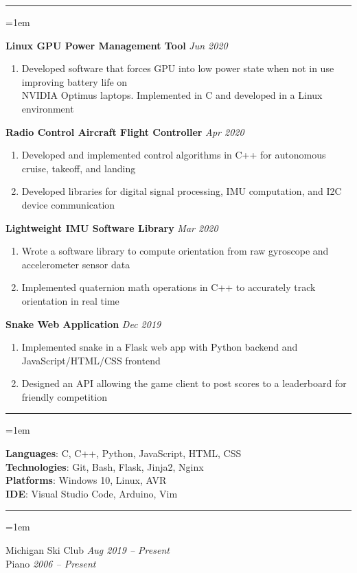 \documentclass[12pt]{article}
\newcommand{\rheader}[1] { 
    \noindent{ 
        \large 
        \textbf{#1} 
        \par 
    }
    \vspace{-10pt}
    \noindent 
    \rule{7.5in}{0.5pt} 
}
\newcommand{\rdate}[1] {
    \hfill 
    \textit{#1}
}
\newcommand{\ritem} {
    \vspace{-10pt} 
    \item
}
\newenvironment{rsection} {
    \vspace{-5pt}
    \par 
    \medskip
    \leftskip=1em
    \noindent 
    \ignorespaces
} {
    \par 
    \medskip
    \vspace{5pt}
}
\newenvironment{rlist} {
    \begin{enumerate}[leftmargin=0.5in, label=$\bullet$]
} {
    \end{enumerate}
    \vspace{-10pt}
}
\begin{document}
\rheader{PROJECTS}
\begin{rsection}
    \textbf{Linux GPU Power Management Tool}  \rdate{Jun 2020}
    \begin{rlist}
        \ritem Developed software that forces GPU into low power state when not in use improving battery life on \\ NVIDIA Optimus laptops. Implemented in C and developed in a Linux environment
    \end{rlist}
    \vspace{5pt}
    \textbf{Radio Control Aircraft Flight Controller}  \rdate{Apr 2020}
    \begin{rlist}
        \ritem Developed and implemented control algorithms in C++ for autonomous cruise, takeoff, and landing
        \ritem Developed libraries for digital signal processing, IMU computation, and I2C device communication
    \end{rlist}
    \vspace{5pt}
    \textbf{Lightweight IMU Software Library} \rdate{Mar 2020}
    \begin{rlist}
        \ritem Wrote a software library to compute orientation from raw gyroscope and accelerometer sensor data
        \ritem Implemented quaternion math operations in C++ to accurately track orientation in real time
    \end{rlist}
    \vspace{5pt}
    \textbf{Snake Web Application} \rdate{Dec 2019}
    \begin{rlist}
        \ritem Implemented snake in a Flask web app with Python backend and JavaScript/HTML/CSS frontend
        \ritem Designed an API allowing the game client to post scores to a leaderboard for friendly competition
    \end{rlist}
\end{rsection}


\rheader{SKILLS}
\begin{rsection}
    \textbf{Languages}: C, C++, Python, JavaScript, HTML, CSS \\
    \textbf{Technologies}: Git, Bash, Flask, Jinja2, Nginx \\
    \textbf{Platforms}: Windows 10, Linux, AVR \\
    \textbf{IDE}: Visual Studio Code, Arduino, Vim
\end{rsection}


\rheader{ACTIVITIES}
\begin{rsection}
    Michigan Ski Club \rdate{Aug 2019 -- Present} \\
    Piano \rdate{2006 -- Present}
\end{rsection}
\end{document}
